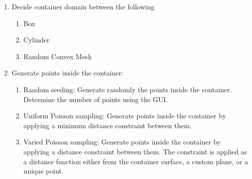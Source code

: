 \documentclass[11pt]{article}
\begin{document}
\begin{enumerate}

\item Decide container domain between the following
\begin{enumerate}
\item Box
\item Cylinder
\item Random Convex Mesh
\end{enumerate}

\item Generate points inside the container:
\begin{enumerate}
\item Random seeding: Generate randomly the points inside the container. Determine the number of points using the GUI.
\item Uniform Poisson sampling: Generate points inside the container by applying a minimum distance constraint between them.
\item Varied Poisson sampling: Generate points inside the container by applying a distance constraint between them. The constraint is applied as a distance function either from the container surface, a custom plane, or a unique point.
\end{enumerate}


\end{enumerate}
\end{document}

